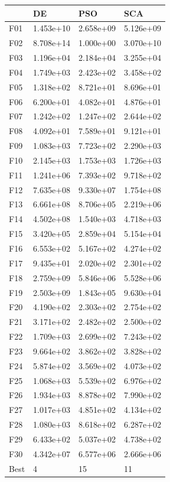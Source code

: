 \begin{tabular}{llll}
\toprule
{} &         DE &        PSO &        SCA \\
\midrule
F01  &  1.453e+10 &  2.658e+09 &  5.126e+09 \\
F02  &  8.708e+14 &  1.000e+00 &  3.070e+10 \\
F03  &  1.196e+04 &  2.184e+04 &  3.255e+04 \\
F04  &  1.749e+03 &  2.423e+02 &  3.458e+02 \\
F05  &  1.318e+02 &  8.721e+01 &  8.696e+01 \\
F06  &  6.200e+01 &  4.082e+01 &  4.876e+01 \\
F07  &  1.242e+02 &  1.247e+02 &  2.644e+02 \\
F08  &  4.092e+01 &  7.589e+01 &  9.121e+01 \\
F09  &  1.083e+03 &  7.723e+02 &  2.290e+03 \\
F10  &  2.145e+03 &  1.753e+03 &  1.726e+03 \\
F11  &  1.241e+06 &  7.393e+02 &  9.718e+02 \\
F12  &  7.635e+08 &  9.330e+07 &  1.754e+08 \\
F13  &  6.661e+08 &  8.706e+05 &  2.219e+06 \\
F14  &  4.502e+08 &  1.540e+03 &  4.718e+03 \\
F15  &  3.420e+05 &  2.859e+04 &  5.154e+04 \\
F16  &  6.553e+02 &  5.167e+02 &  4.274e+02 \\
F17  &  9.435e+01 &  2.020e+02 &  2.301e+02 \\
F18  &  2.759e+09 &  5.846e+06 &  5.528e+06 \\
F19  &  2.503e+09 &  1.843e+05 &  9.630e+04 \\
F20  &  4.190e+02 &  2.303e+02 &  2.754e+02 \\
F21  &  3.171e+02 &  2.482e+02 &  2.500e+02 \\
F22  &  1.709e+03 &  2.699e+02 &  7.243e+02 \\
F23  &  9.664e+02 &  3.862e+02 &  3.828e+02 \\
F24  &  5.874e+02 &  3.569e+02 &  4.073e+02 \\
F25  &  1.068e+03 &  5.539e+02 &  6.976e+02 \\
F26  &  1.934e+03 &  8.878e+02 &  7.990e+02 \\
F27  &  1.017e+03 &  4.851e+02 &  4.134e+02 \\
F28  &  1.080e+03 &  8.618e+02 &  6.287e+02 \\
F29  &  6.433e+02 &  5.037e+02 &  4.738e+02 \\
F30  &  4.342e+07 &  6.577e+06 &  2.666e+06 \\
Best &          4 &         15 &         11 \\
\bottomrule
\end{tabular}
